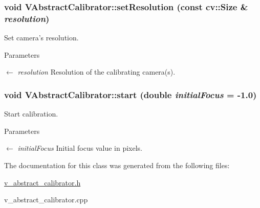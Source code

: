 \hypertarget{classVAbstractCalibrator_ab4eabbb2a1ce73af601c5fee87da5e24}{
\subsubsection[{setResolution}]{\setlength{\rightskip}{0pt plus 5cm}void VAbstractCalibrator::setResolution (const cv::Size \& {\em resolution})}}
\label{classVAbstractCalibrator_ab4eabbb2a1ce73af601c5fee87da5e24}
Set camera's resolution. 
\begin{DoxyParams}{Parameters}
\item[\mbox{$\leftarrow$} {\em resolution}]Resolution of the calibrating camera(s). \end{DoxyParams}
\hypertarget{classVAbstractCalibrator_a52f0c84c3d9398102be43f4304d2fa18}{
\subsubsection[{start}]{\setlength{\rightskip}{0pt plus 5cm}void VAbstractCalibrator::start (double {\em initialFocus} = {\ttfamily -\/1.0})}}
\label{classVAbstractCalibrator_a52f0c84c3d9398102be43f4304d2fa18}
Start calibration. 
\begin{DoxyParams}{Parameters}
\item[\mbox{$\leftarrow$} {\em initialFocus}]Initial focus value in pixels. \end{DoxyParams}


The documentation for this class was generated from the following files:\begin{DoxyCompactItemize}
\item 
\hyperlink{v__abstract__calibrator_8h}{v\_\-abstract\_\-calibrator.h}\item 
v\_\-abstract\_\-calibrator.cpp\end{DoxyCompactItemize}
